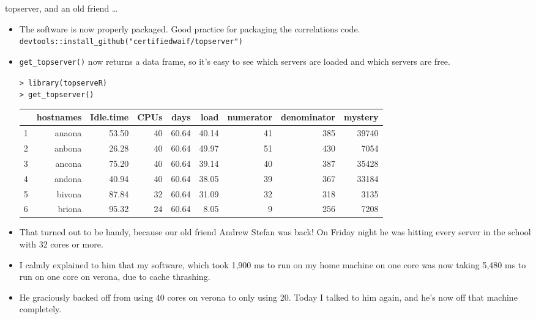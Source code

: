 \documentclass{beamer}
\begin{document}
\begin{frame}{topserver, and an old friend \ldots}
\begin{itemize}
\item The software is now properly packaged. Good practice for packaging the correlations code.
\small \texttt{devtools::install\_github("certifiedwaif/topserver")}
\item \texttt{get\_topserver()} now returns a data frame, so it's easy to see which servers are loaded and 
			which servers are free. 

\texttt{> library(topserveR) \\
> get\_topserver()
}
{\tiny
\begin{tabular}{|l|rrrrrrrr|}
\hline
   &hostnames &Idle.time &CPUs  &days  &load &numerator &denominator &mystery \\
\hline
1&     anaona&     53.50&   40& 60.64& 40.14&        41&         385&   39740 \\
2&     anbona&     26.28&   40& 60.64& 49.97&        51&         430&    7054 \\
3&     ancona&     75.20&   40& 60.64& 39.14&        40&         387&   35428 \\
4&     andona&     40.94&   40& 60.64& 38.05&        39&         367&   33184 \\
5&     bivona&     87.84&   32& 60.64& 31.09&        32&         318&    3135 \\
6&     briona&     95.32&   24& 60.64&  8.05&         9&         256&    7208 \\
\hline
\end{tabular}
}

\item That turned out to be handy, because our old friend Andrew Stefan was back! On Friday night he was 
			hitting every server in the school with	32 cores or more.
\item I calmly explained to him that my software, which took 1,900 ms to run on my home machine on one core 
			was now taking 5,480 ms to run on one core on verona, due to cache thrashing.
\item He graciously backed off from using 40 cores on verona to only using 20. Today I talked to him again,
			and he's now off that machine completely.
\end{itemize}
\end{frame}
\end{document}
